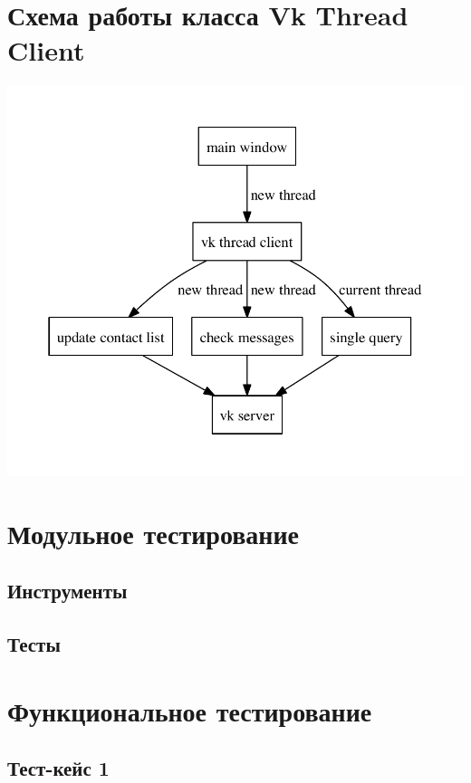 \documentclass[12pt]{article}
\begin{document}
\section{Схема работы класса Vk Thread Client}
\includegraphics{./diag/work_logic.pdf}

\newpage
\section{Модульное тестирование}
\subsection{Инструменты}

\subsection{Тесты}




\newpage
\section{Функциональное тестирование}
\subsection{Тест-кейс 1}
\end{document}

